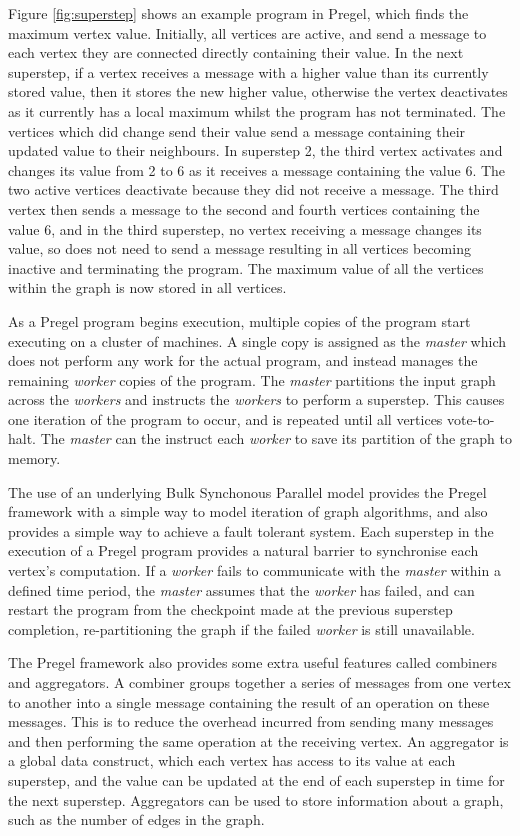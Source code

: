 Figure \ref{fig:superstep} shows an example program in Pregel, which finds the maximum vertex value. Initially, all vertices are active, and send a message to each vertex they are connected directly containing their value. In the next superstep, if a vertex receives a message with a higher value than its currently stored value, then it stores the new higher value, otherwise the vertex deactivates as it currently has a local maximum whilst the program has not terminated. The vertices which did change send their value send a message containing their updated value to their neighbours. In superstep 2, the third vertex activates and changes its value from 2 to 6 as it receives a message containing the value 6. The two active vertices deactivate because they did not receive a message. The third vertex then sends a message to the second and fourth vertices containing the value 6, and in the third superstep, no vertex receiving a message changes its value, so does not need to send a message resulting in all vertices becoming inactive and terminating the program. The maximum value of all the vertices within the graph is now stored in all vertices.

As a Pregel program begins execution, multiple copies of the program start executing on a cluster of machines. A single copy is assigned as the \emph{master} which does not perform any work for the actual program, and instead manages the remaining \emph{worker} copies of the program. The \emph{master} partitions the input graph across the \emph{workers} and instructs the \emph{workers} to perform a superstep. This causes one iteration of the program to occur, and is repeated until all vertices vote-to-halt. The \emph{master} can the instruct each \emph{worker} to save its partition of the graph to memory.

The use of an underlying Bulk Synchonous Parallel model provides the Pregel framework with a simple way to model iteration of graph algorithms, and also provides a simple way to achieve a fault tolerant system. Each superstep in the execution of a Pregel program provides a natural barrier to synchronise each vertex's computation. If a \emph{worker} fails to communicate with the \emph{master} within a defined time period, the \emph{master} assumes that the \emph{worker} has failed, and can restart the program from the checkpoint made at the previous superstep completion, re-partitioning the graph if the failed \emph{worker} is still unavailable.

The Pregel framework also provides some extra useful features called combiners and aggregators. A combiner groups together a series of messages from one vertex to another into a single message containing the result of an operation on these messages. This is to reduce the overhead incurred from sending many messages and then performing the same operation at the receiving vertex. An aggregator is a global data construct, which each vertex has access to its value at each superstep, and the value can be updated at the end of each superstep in time for the next superstep. Aggregators can be used to store information about a graph, such as the number of edges in the graph.

